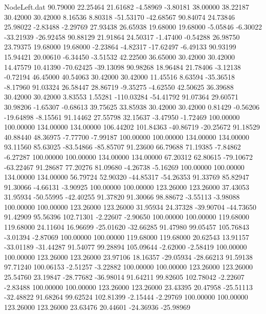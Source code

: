 \begin{filecontents}{NodeLeft.dat}
  90.79000   22.25464   21.61682    -4.58969   -3.80181   38.00000   38.22187   30.42000   30.42000    8.16536    8.80318  -51.53170  -42.68567
  90.84074   24.73846   25.98022    -2.83488   -2.29769   27.93438   26.65938   19.68000   19.68000   -5.05846   -6.30022  -33.21939  -26.92458
  90.88129   21.91864   24.50317    -1.47400   -0.54288   26.98750   23.79375   19.68000   19.68000   -2.23864   -4.82317  -17.62497   -6.49133
  90.93199   15.94421   20.00610    -6.34450   -3.51532   42.22500   36.65000   30.42000   30.42000   14.47579   10.41390  -70.62425  -39.13098
  90.98268   18.96484   21.78406    -3.12138   -0.72194   46.45000   40.54063   30.42000   30.42000   11.45516    8.63594  -35.36518   -8.17960
  91.03324   26.58447   28.86719    -9.35275   -4.62550   42.50625   36.39688   30.42000   30.42000    3.83553    1.55281 -110.03284  -54.41792
  91.07364   29.60571   30.98206    -1.65307   -0.68613   39.75625   33.85938   30.42000   30.42000    0.81429   -0.56206  -19.64898   -8.15561
  91.14462   27.55798   32.15637    -3.47950   -1.72469  100.00000  100.00000  134.00000  134.00000  106.44202  101.84363  -40.86719  -20.25672
  91.18529   40.88440   48.36975    -7.77700   -7.99187  100.00000  100.00000  134.00000  134.00000   93.11560   85.63025  -83.54866  -85.85707
  91.23600   66.79688   71.19385    -7.84862   -6.27287  100.00000  100.00000  134.00000  134.00000   67.20312   62.80615  -79.10672  -63.22467
  91.28687   77.20276   81.09680    -4.26738   -5.16269  100.00000  100.00000  134.00000  134.00000   56.79724   52.90320  -44.85317  -54.26353
  91.33769   85.82947   91.30066    -4.66131   -3.90925  100.00000  100.00000  123.26000  123.26000   37.43053   31.95934  -50.55995  -42.40255
  91.37820   91.30066   98.88672    -3.55113   -3.98088  100.00000  100.00000  123.26000  123.26000   31.95934   24.37328  -39.90704  -44.73650
  91.42909   95.56396  102.71301    -2.22607   -2.90650  100.00000  100.00000  119.68000  119.68000   24.11604   16.96699  -25.01620  -32.66285
  91.47980   99.05457  105.76843    -3.01394   -2.87069  100.00000  100.00000  119.68000  119.68000   20.62543   13.91157  -33.01189  -31.44287
  91.54077   99.28894  105.09644    -2.62000   -2.58419  100.00000  100.00000  123.26000  123.26000   23.97106   18.16357  -29.05934  -28.66213
  91.59138   97.71240  100.06153    -2.51257   -3.22882  100.00000  100.00000  123.26000  123.26000   25.54760   23.19847  -28.77682  -36.98014
  91.64211   99.82605  102.78042    -2.22607   -2.83488  100.00000  100.00000  123.26000  123.26000   23.43395   20.47958  -25.51113  -32.48822
  91.68264   99.62524  102.81399    -2.15444   -2.29769  100.00000  100.00000  123.26000  123.26000   23.63476   20.44601  -24.36936  -25.98969

\end{filecontents}
